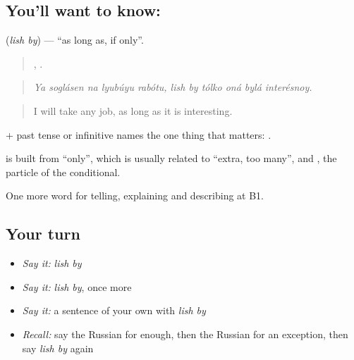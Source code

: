 \subsection*{You'll want to know:  }
\textbf{ } (\emph{lish by}) — \textquotedblleft{}as long as, if only\textquotedblright{}.

\begin{quote}
    ,      .
\end{quote}

\begin{quote}
\emph{Ya soglásen na lyubúyu rabótu, lish by tólko oná bylá interésnoy.}
\end{quote}

\begin{quote}
I will take any job, as long as it is interesting.
\end{quote}

\emph{ } + past tense or infinitive names the one thing that matters: \emph{  }.

\begin{cousinweb}
\textbf{ } is built from \emph{} \textquotedblleft{}only\textquotedblright{}, which is usually related to \emph{} \textquotedblleft{}extra, too many\textquotedblright{}, and \emph{}, the particle of the conditional.
\end{cousinweb}

\begin{grammarlens}[title={What you've built}]
One more word for telling, explaining and describing at B1.
\end{grammarlens}

\subsection*{Your turn}
\begin{itemize}
\raggedright
  \item \emph{Say it:} \emph{lish by}
  \item \emph{Say it:} \emph{lish by}, once more
  \item \emph{Say it:} a sentence of your own with \emph{lish by}
  \item \emph{Recall:} say the Russian for enough, then the Russian for an exception, then say \emph{lish by} again
\end{itemize}

